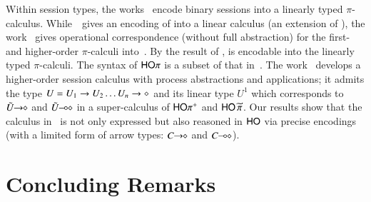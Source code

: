 \documentclass[preprint,11pt]{elsarticle}
\begin{document}
{{Within session types, the works~\cite{DemangeonH11,Dardha:2012:STR:2370776.2370794} 
encode binary sessions into a linearly typed $\pi$-calculus. 
While~\cite{DemangeonH11}~gives an encoding of \sessp into a linear calculus 
(an extension of \cite{BHY}),  
the work~\cite{Dardha:2012:STR:2370776.2370794} 
gives  operational correspondence (without full abstraction)
for the first- and higher-order 
$\pi$-calculi into~\cite{LinearPi}. 
By the result of \cite{DemangeonH11}, 
\HOpp is encodable  into the linearly typed $\pi$-calculi.     
The syntax of $\mathsf{HO}\pi$ is a subset of that in~\cite{tlca07,MostrousY15}.
The work~\cite{tlca07} develops a higher-order session calculus
with process abstractions and applications; it admits the type 
$U=U_1 \rightarrow U_2 \dots U_n \rightarrow \diamond$ and its linear type 
$U^1$
which corresponds to $\tilde{U}\!\! \rightarrow\!\! \diamond$ and $\tilde{U}\!\! \multimap\!\! \diamond$ in 
a super-calculus of $\mathsf{HO\pi^{+}}$ and $\mathsf{HO}\,{\widetilde{\pi}}$. 
Our results show that
the calculus in~\cite{tlca07} is not only expressed but 
also reasoned in 
$\mathsf{HO}$ via precise encodings (with a limited form of arrow types: $C\!\! \rightarrow\!\! \diamond$ and $C\!\! \multimap\!\! \diamond$). 

\section{Concluding Remarks}
\label{sec:concl}
%

}}
\end{document}
